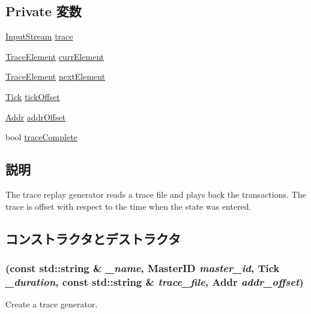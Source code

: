 \subsection*{Private 変数}
\begin{DoxyCompactItemize}
\item 
\hyperlink{classTraceGen_1_1InputStream}{InputStream} \hyperlink{classTraceGen_a5dfbfce0ad4d1bee9295a75fb9f22e67}{trace}
\item 
\hyperlink{structTraceGen_1_1TraceElement}{TraceElement} \hyperlink{classTraceGen_a9569c34c782ed59f9eabae29d83b3c69}{currElement}
\item 
\hyperlink{structTraceGen_1_1TraceElement}{TraceElement} \hyperlink{classTraceGen_af75daad6a6b104153bcfc8b0b9738fc1}{nextElement}
\item 
\hyperlink{base_2types_8hh_a5c8ed81b7d238c9083e1037ba6d61643}{Tick} \hyperlink{classTraceGen_a909a0f7344e9c9dc4e84b9db494e3913}{tickOffset}
\item 
\hyperlink{base_2types_8hh_af1bb03d6a4ee096394a6749f0a169232}{Addr} \hyperlink{classTraceGen_ab197a601b77c63555474cccf2ba4132c}{addrOffset}
\item 
bool \hyperlink{classTraceGen_a072f6c8d6720b220445074f5a4c0ceff}{traceComplete}
\end{DoxyCompactItemize}


\subsection{説明}
The trace replay generator reads a trace file and plays back the transactions. The trace is offset with respect to the time when the state was entered. 

\subsection{コンストラクタとデストラクタ}
\hypertarget{classTraceGen_a6c6cce0385b1ab2fd059a9b4ac5ccd5a}{
\subsubsection[{TraceGen}]{ (const std::string \& {\em \_\-name}, \/  {\bf MasterID} {\em master\_\-id}, \/  {\bf Tick} {\em \_\-duration}, \/  const std::string \& {\em trace\_\-file}, \/  {\bf Addr} {\em addr\_\-offset})}}
\label{classTraceGen_a6c6cce0385b1ab2fd059a9b4ac5ccd5a}
Create a trace generator.


